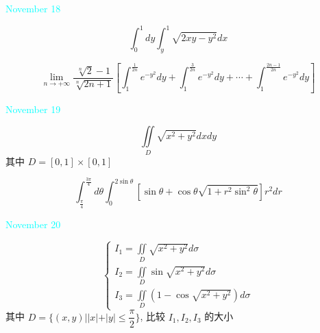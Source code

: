 \begin{solution}
	
\end{solution}


\textcolor{cyan}{November 18}

\begin{example}[][Exam: 37.3.7]
	$$\int_{0}^{1}dy\int_{y}^{1}\sqrt{2xy-y^2}dx$$
\end{example}

\begin{solution}
	
\end{solution}

\begin{example}[][Exam: 37.3.8]
	$$\lim\limits_{n\to +\infty}\dfrac{\sqrt[n]{2}-1}{\sqrt[n]{2n+1}}\left[\int_{1}^{\frac{1}{2n}}e^{-y^2}dy+
	\int_{1}^{\frac{3}{2n}}e^{-y^2}dy+\cdots+\int_{1}^{\frac{2n-1}{2n}}e^{-y^2}dy \right]$$
\end{example}

\begin{solution}
	
\end{solution}


\textcolor{cyan}{November 19}

\begin{example}[][Exam: 37.3.9]
	$$\iint\limits_{D}\sqrt{x^2+y^2}dxdy$$
	其中 $D = [0,1]\times [0,1]$
\end{example}

\begin{solution}
	
\end{solution}


\begin{example}[][Exam: 37.3.10]
	$$\int_{\frac{\pi}{4}}^{\frac{3\pi}{4}}d\theta\int_{0}^{2\sin\theta}\left[ \sin\theta+\cos\theta\sqrt{1+r^2\sin^{2}\theta}\right]r^2dr$$
\end{example}
\begin{solution}
	
\end{solution}


\textcolor{cyan}{November 20}

\begin{example}[][Exam: 37.3.11]
	$$\begin{cases}
		I_{1}=\iint\limits_{D}\sqrt{x^2+y^2}d\sigma\\
		I_{2}=\iint\limits_{D}\sin\sqrt{x^2+y^2}d\sigma\\
		I_{3}=\iint\limits_{D}(1-\cos\sqrt{x^2+y^2})d\sigma
	\end{cases}$$
	其中 $D=\{(x,y)||x|+|y|\leq \dfrac{\pi}{2}\}$, 比较 $I_{1},I_{2},I_{3}$ 的大小
\end{example}
\begin{solution}
	
\end{solution}


